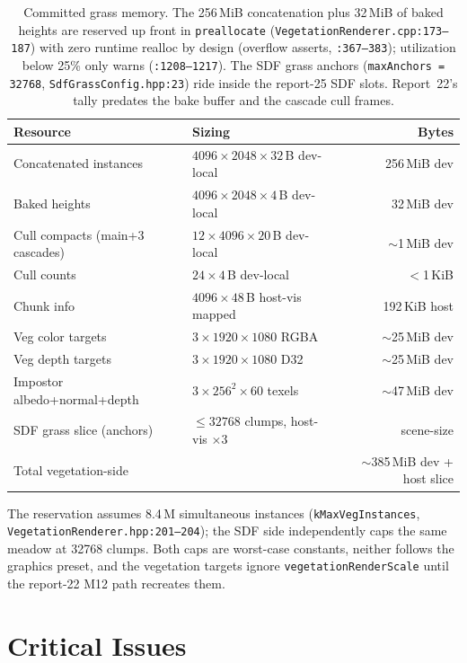 \documentclass[11pt,a4paper]{article}
\begin{document}
\begin{table}[h]
\centering
\small
\begin{tabular}{@{}p{5.9cm}p{4.3cm}r@{}}
\toprule
\textbf{Resource} & \textbf{Sizing} & \textbf{Bytes} \\
\midrule
Concatenated instances & $4096 \times 2048 \times 32$\,B dev-local & 256\,MiB dev \\
Baked heights & $4096 \times 2048 \times 4$\,B dev-local & 32\,MiB dev \\
Cull compacts (main+3 cascades) & $12 \times 4096 \times 20$\,B dev-local & $\sim$1\,MiB dev \\
Cull counts & $24 \times 4$\,B dev-local & $<$1\,KiB \\
Chunk info & $4096 \times 48$\,B host-vis mapped & 192\,KiB host \\
Veg color targets & $3 \times 1920\times1080$ RGBA & $\sim$25\,MiB dev \\
Veg depth targets & $3 \times 1920\times1080$ D32 & $\sim$25\,MiB dev \\
Impostor albedo+normal+depth & $3 \times 256^2 \times 60$ texels & $\sim$47\,MiB dev \\
SDF grass slice (anchors) & $\le 32768$ clumps, host-vis $\times$3 & scene-size \\
\midrule
Total vegetation-side & & $\sim$385\,MiB dev + host slice \\
\bottomrule
\end{tabular}
\caption{Committed grass memory. The 256\,MiB concatenation plus 32\,MiB of
baked heights are reserved up front in \texttt{preallocate}
(\texttt{VegetationRenderer.cpp:173--187}) with zero runtime realloc by
design (overflow asserts, \texttt{:367--383}); utilization below 25\%
only warns (\texttt{:1208--1217}). The SDF grass anchors
(\texttt{maxAnchors = 32768}, \texttt{SdfGrassConfig.hpp:23}) ride inside
the report-25 SDF slots. Report~22's tally predates the bake buffer and the
cascade cull frames.}
\end{table}

The reservation assumes 8.4\,M simultaneous instances
(\texttt{kMaxVegInstances}, \texttt{VegetationRenderer.hpp:201--204});
the SDF side independently caps the same meadow at 32768 clumps. Both caps
are worst-case constants, neither follows the graphics preset, and the
vegetation targets ignore \texttt{vegetationRenderScale} until the report-22
M12 path recreates them.

\section{Critical Issues}
\end{document}
